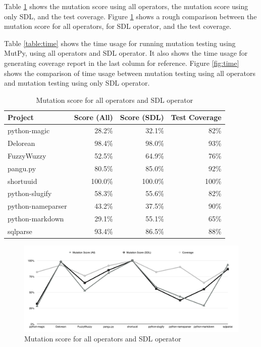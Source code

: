 \documentclass[12pt]{article}
\begin{document}
Table \ref{table:score} shows the mutation score using all operators, the mutation score using only SDL, and the test coverage. Figure \ref{fig:score} shows a rough comparison between the mutation score for all operators, for SDL operator, and the test coverage.

Table \ref{table:time} shows the time usage for running mutation testing using MutPy, using all operators and SDL operator. It also shows the time usage for generating coverage report in the last column for reference. Figure \ref{fig:time} shows the comparison of time usage between mutation testing using all operators and mutation testing using only SDL operator.

\begin{table}[H]
\begin{center}
\caption{Mutation score for all operators and SDL operator}
\label{table:score}
\begin{tabular}{|l|r|r|r|}
\hline
{\bf Project} & {\bf Score (All)} & {\bf Score (SDL)} & {\bf Test Coverage} \\
\hline
python-magic      & 28.2\%  &  32.1\% &  82\% \\
Delorean          & 98.4\%  &  98.0\% &  93\% \\
FuzzyWuzzy        & 52.5\%  &  64.9\% &  76\% \\
pangu.py          & 80.5\%  &  85.0\% &  92\% \\
shortuuid         & 100.0\% & 100.0\% & 100\% \\
python-slugify    & 58.3\%  &  55.6\% &  82\% \\
python-nameparser & 43.2\%  &  37.5\% &  90\% \\
python-markdown   & 29.1\%  &  55.1\% &  65\% \\
sqlparse          & 93.4\%  &  86.5\% &  88\% \\
\hline
\end{tabular}
\end{center}
\end{table}

\begin{figure}[H]
\begin{center}
\caption{Mutation score for all operators and SDL operator}
\label{fig:score}
\includegraphics[width=15cm]{score}
\end{center}
\end{figure}
\end{document}
